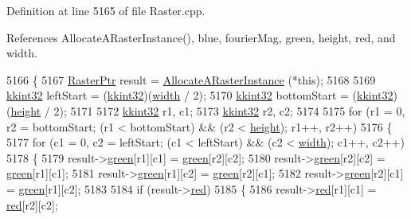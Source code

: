 Definition at line 5165 of file Raster.\+cpp.



References Allocate\+A\+Raster\+Instance(), blue, fourier\+Mag, green, height, red, and width.


\begin{DoxyCode}
5166 \{
5167   \hyperlink{class_k_k_b_1_1_raster}{RasterPtr}  result = \hyperlink{class_k_k_b_1_1_raster_aa879980d112c01cb7ad9a3cfc7cd6f64}{AllocateARasterInstance} (*\textcolor{keyword}{this});
5168 
5169   \hyperlink{namespace_k_k_b_a8fa4952cc84fda1de4bec1fbdd8d5b1b}{kkint32}  leftStart   = (\hyperlink{namespace_k_k_b_a8fa4952cc84fda1de4bec1fbdd8d5b1b}{kkint32})(\hyperlink{class_k_k_b_1_1_raster_ae0bcc103e191c3421d7692dc69ceb554}{width}  / 2);
5170   \hyperlink{namespace_k_k_b_a8fa4952cc84fda1de4bec1fbdd8d5b1b}{kkint32}  bottomStart = (\hyperlink{namespace_k_k_b_a8fa4952cc84fda1de4bec1fbdd8d5b1b}{kkint32})(\hyperlink{class_k_k_b_1_1_raster_af39ff189de4fbb6de98392e187efafb7}{height} / 2);
5171 
5172   \hyperlink{namespace_k_k_b_a8fa4952cc84fda1de4bec1fbdd8d5b1b}{kkint32}  r1, c1;
5173   \hyperlink{namespace_k_k_b_a8fa4952cc84fda1de4bec1fbdd8d5b1b}{kkint32}  r2, c2;
5174 
5175   \textcolor{keywordflow}{for}  (r1 = 0, r2 = bottomStart;  (r1 < bottomStart)  &&  (r2 < \hyperlink{class_k_k_b_1_1_raster_af39ff189de4fbb6de98392e187efafb7}{height});  r1++, r2++)
5176   \{
5177     \textcolor{keywordflow}{for}  (c1 = 0,  c2 = leftStart;  (c1 < leftStart)   &&  (c2 < \hyperlink{class_k_k_b_1_1_raster_ae0bcc103e191c3421d7692dc69ceb554}{width});   c1++, c2++)
5178     \{
5179       result->\hyperlink{class_k_k_b_1_1_raster_a2d2238911145488e226cd2e34fc8448c}{green}[r1][c1] = \hyperlink{class_k_k_b_1_1_raster_a2d2238911145488e226cd2e34fc8448c}{green}[r2][c2];
5180       result->\hyperlink{class_k_k_b_1_1_raster_a2d2238911145488e226cd2e34fc8448c}{green}[r2][c2] = \hyperlink{class_k_k_b_1_1_raster_a2d2238911145488e226cd2e34fc8448c}{green}[r1][c1];
5181       result->\hyperlink{class_k_k_b_1_1_raster_a2d2238911145488e226cd2e34fc8448c}{green}[r1][c2] = \hyperlink{class_k_k_b_1_1_raster_a2d2238911145488e226cd2e34fc8448c}{green}[r2][c1];
5182       result->\hyperlink{class_k_k_b_1_1_raster_a2d2238911145488e226cd2e34fc8448c}{green}[r2][c1] = \hyperlink{class_k_k_b_1_1_raster_a2d2238911145488e226cd2e34fc8448c}{green}[r1][c2];
5183 
5184       \textcolor{keywordflow}{if}  (result->\hyperlink{class_k_k_b_1_1_raster_a7fd39e0463c8477d0d0d26e11126d285}{red})
5185       \{
5186         result->\hyperlink{class_k_k_b_1_1_raster_a7fd39e0463c8477d0d0d26e11126d285}{red}[r1][c1] = \hyperlink{class_k_k_b_1_1_raster_a7fd39e0463c8477d0d0d26e11126d285}{red}[r2][c2];

\end{DoxyCode}
